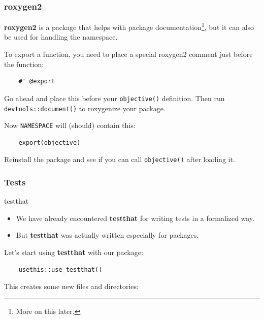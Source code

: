 \documentclass[aspectratio=1610,onlytextwidth]{beamer}
\begin{document}
\begin{frame}[c,fragile]
  \frametitle{roxygen2}

  \textbf{roxygen2} is a package that helps with package documentation\footnote{More on this later.},
  but it can also be used for handling the namespace.

  \bigskip\pause

  To export a function, you need to place a special roxygen2 comment just before the function:
  \begin{lstlisting}
    #' @export
  \end{lstlisting}

  \medskip\pause

  Go ahead and place this before your \lstinline{objective()} definition. Then run
  \lstinline{devtools::document()} to roxygenize your package.

  \bigskip\pause

  Now \texttt{NAMESPACE} will (should) contain this:
  \begin{lstlisting}
    export(objective)
  \end{lstlisting}

  \medskip\pause

  Reinstall the package and see if you can call \lstinline{objective()} after
  loading it.
\end{frame}

\begin{frame}[c,fragile]
  \frametitle{Tests}

  \begin{block}{testthat}
    \begin{itemize}
      \item We have already encountered \textbf{testthat} for writing tests in a formalized way.
      \item But \textbf{testthat} was actually written especially for packages.
    \end{itemize}
  \end{block}

  \pause\bigskip

  Let's start using \textbf{testthat} with our package:
  \begin{lstlisting}
    usethis::use_testthat()
  \end{lstlisting}

  \bigskip\pause

  This creates some new files and directories:

  \medskip

\end{frame}
\end{document}
